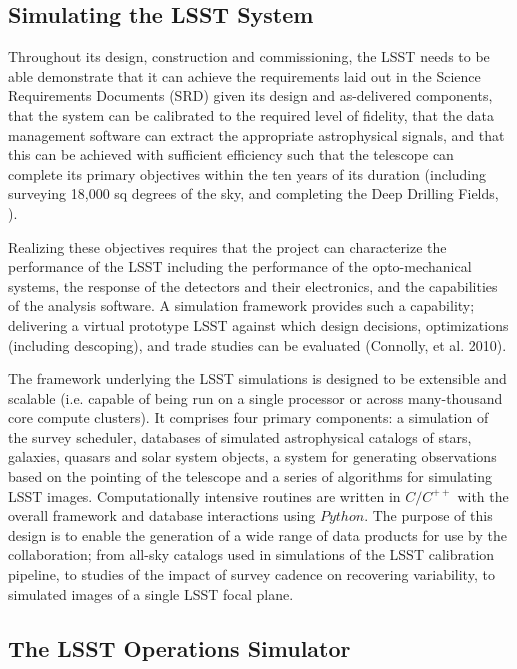 \documentclass{emulateapj}
\newcommand{\B}[1]{{#1}}
\begin{document}
\B{
\vskip 0.4in
\subsection{Simulating the LSST System}


Throughout its design, construction and commissioning, the LSST needs
to be able demonstrate that it can achieve the requirements laid out
in the Science Requirements Documents (SRD) given its design and
as-delivered components, that the system can be calibrated to the
required level of fidelity, that the data management software can
extract the appropriate astrophysical signals, and that this can be
achieved with sufficient efficiency such that the telescope can
complete its primary objectives within the ten years of its duration
(including surveying 18,000 sq degrees of the sky, and completing the
Deep Drilling Fields, \citealt{jones2013}).


Realizing these objectives requires that the project can characterize
the performance of the LSST including the performance of the
opto-mechanical systems, the response of the detectors and their
electronics, and the capabilities of the analysis software. A
simulation framework provides such a capability; delivering a virtual
prototype LSST against which design decisions, optimizations
(including descoping), and trade studies can be evaluated (Connolly,
et al. 2010).


The framework underlying the LSST simulations is designed to be
extensible and scalable (i.e. capable of being run on a single
processor or across many-thousand core compute clusters). It comprises
four primary components: a simulation of the survey scheduler,
databases of simulated astrophysical catalogs of stars, galaxies,
quasars and solar system objects, a system for generating observations
based on the pointing of the telescope and a series of algorithms for
simulating LSST images. Computationally intensive routines are written
in $C/C^{++}$ with the overall framework and database interactions
using $Python$.  The purpose of this design is to enable the
generation of a wide range of data products for use by the
collaboration; from all-sky catalogs used in simulations of the LSST
calibration pipeline, to studies of the impact of survey cadence on
recovering variability, to simulated images of a single LSST focal
plane.


\subsection{ The LSST Operations Simulator }

}
\end{document}
